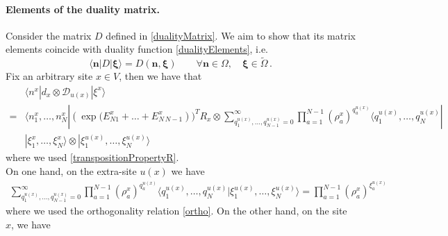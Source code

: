 \documentclass[10pt]{article}
\numberwithin{equation}{section}
\numberwithin{equation}{subsection}
\newcommand{\dd}{\mathcal{D}_{u(x)}}
\begin{document}
\paragraph{Elements of the duality matrix.}
Consider the matrix $D$ defined in \eqref{dualityMatrix}.
We aim to show that its matrix elements coincide with duality function \eqref{dualityElements}, i.e.
\begin{equation}\label{proofDualityElements}
\langle \bm{n}|D|\bm{\xi}\rangle=D(\bm{n},\bm{\xi})\qquad   \forall \bm{n}\in \Omega,\quad \bm{\xi}\in \widetilde{\Omega}\,.
\end{equation}
Fix an arbitrary site $x\in V$, then we have that 
\begin{align}
	 &\langle n^{x}|d_{x}\otimes \dd|\xi^{x}\rangle\nonumber\\=&\langle n_{1}^{x},\ldots,n_{N}^{x}| (\exp{(E_{N1}^{x}+\ldots+E_{N\,N-1}^{x}}))^{T}R_{x}\otimes\sum_{q_{1}^{u(x)},\ldots,q_{N-1}^{u(x)}=0}^{\infty}\prod_{a=1}^{N-1}\left(\rho_{a}^{x}\right)^{q_{a}^{u(x)}}\langle q_{1}^{u(x)},\ldots,q_{N}^{u(x)}|\nonumber
	 \\&|\xi_{1}^{x},\ldots,\xi_{N}^{x}\rangle \otimes |\xi_{1}^{u(x)},\ldots,\xi_{N}^{u(x)}\rangle
\end{align}
where we used \eqref{transpositionPropertyR}. \\
On one hand, on the extra-site $u(x)$ we have 
\begin{align}
\sum_{q_{1}^{u(x)},\ldots,q_{N-1}^{u(x)}=0}^{\infty}\prod_{a=1}^{N-1}\left(\rho_{a}^{x}\right)^{q_{a}^{u(x)}}\langle q_{1}^{u(x)},\ldots,q_{N}^{u(x)}|\xi_{1}^{u(x)},\ldots,\xi_{N}^{u(x)}\rangle=\prod_{a=1}^{N-1}\left(\rho_{a}^{x}\right)^{\xi_{a}^{u(x)}}
\end{align}
where  we used the orthogonality relation \eqref{ortho}. 
On the other hand, on the site $x$, we have 
\end{document}
